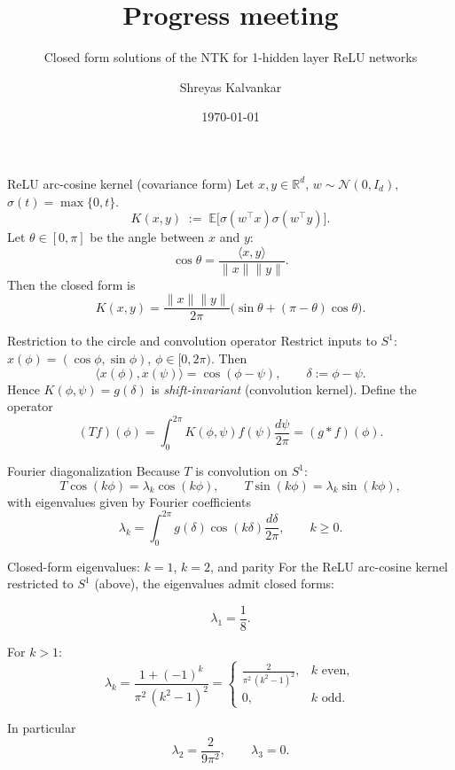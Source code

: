 \documentclass[10pt,aspectratio=169]{beamer}
\title{Progress meeting}
\subtitle{Closed form solutions of the NTK for 1-hidden layer ReLU networks}
\author{Shreyas Kalvankar}
\institute{TU Delft}
\date{\today}
\newcommand{\E}{\mathbb{E}}
\newcommand{\R}{\mathbb{R}}
\begin{document}
\maketitle

\begin{frame}{ReLU arc-cosine kernel (covariance form)}
	Let $x,y\in\R^d$, $w\sim\mathcal N(0,I_d)$, $\sigma(t)=\max\{0,t\}$.
	\[
		K(x,y)\;:=\;\E\big[\sigma(w^\top x)\sigma(w^\top y)\big].
	\]
	Let $\theta\in[0,\pi]$ be the angle between $x$ and $y$:
	\[
		\cos\theta=\frac{\langle x,y\rangle}{\|x\|\|y\|}.
	\]
	Then the closed form is
	\[
		\boxed{
			K(x,y)=\frac{\|x\|\|y\|}{2\pi}\Big(\sin\theta+(\pi-\theta)\cos\theta\Big).
		}
	\]
\end{frame}

\begin{frame}{Restriction to the circle and convolution operator}
	Restrict inputs to $S^1$: $x(\phi)=(\cos\phi,\sin\phi)$, $\phi\in[0,2\pi)$.
	Then
	\[
		\langle x(\phi),x(\psi)\rangle=\cos(\phi-\psi),\qquad \delta:=\phi-\psi.
	\]
	Hence $K(\phi,\psi)=g(\delta)$ is \emph{shift-invariant} (convolution kernel).
	Define the operator
	\[
		(Tf)(\phi)=\int_0^{2\pi}K(\phi,\psi)f(\psi)\frac{d\psi}{2\pi}
		= (g*f)(\phi).
	\]
\end{frame}

\begin{frame}{Fourier diagonalization}
	Because $T$ is convolution on $S^1$:
	\[
		T\cos(k\phi)=\lambda_k\cos(k\phi),\qquad
		T\sin(k\phi)=\lambda_k\sin(k\phi),
	\]
	with eigenvalues given by Fourier coefficients
	\[
		\lambda_k=\int_{0}^{2\pi} g(\delta)\cos(k\delta)\frac{d\delta}{2\pi},\qquad k\ge 0.
	\]
\end{frame}

\begin{frame}{Closed-form eigenvalues: $k=1$, $k=2$, and parity}
	For the ReLU arc-cosine kernel restricted to $S^1$ (above),
	the eigenvalues admit closed forms:

	\[
		\boxed{\lambda_1=\frac18.}
	\]

	For $k>1$:
	\[
		\boxed{
			\lambda_k=
			\frac{1+(-1)^k}{\pi^2\,(k^2-1)^2}
			=
			\begin{cases}
				\displaystyle \frac{2}{\pi^2\,(k^2-1)^2}, & k \text{ even}, \\[6pt]
				0,                                        & k \text{ odd}.
			\end{cases}}
	\]

	In particular
	\[
		\lambda_2=\frac{2}{9\pi^2},\qquad
		\lambda_3=0.
	\]
\end{frame}
\end{document}
